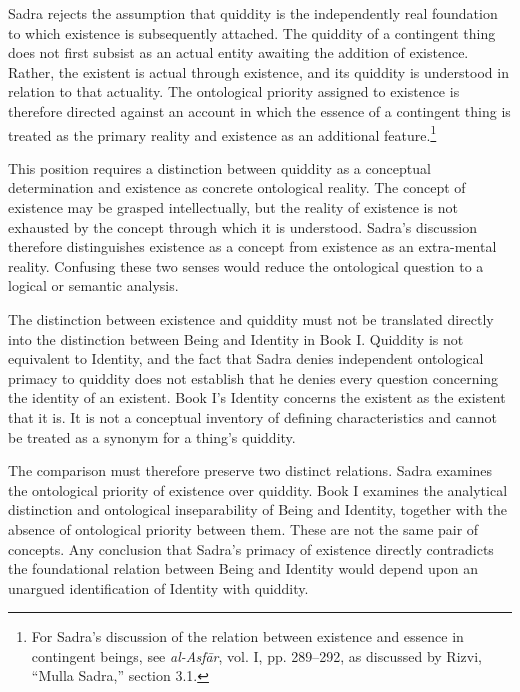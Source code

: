 \label{para:VS.B01.P01.C08.S17.SS04.P002}

Sadra rejects the assumption that
quiddity is the independently real
foundation to which existence is
subsequently attached. The quiddity
of a contingent thing does not first
subsist as an actual entity awaiting
the addition of existence. Rather,
the existent is actual through existence,
and its quiddity is understood in
relation to that actuality. The
ontological priority assigned to
existence is therefore directed
against an account in which the
essence of a contingent thing is
treated as the primary reality
and existence as an additional
feature.\footnote{For Sadra's discussion
of the relation between existence
and essence in contingent beings,
see \textit{al-Asfār}, vol. I,
pp. 289--292, as discussed by Rizvi,
``Mulla Sadra,'' section 3.1.}

\label{para:VS.B01.P01.C08.S17.SS04.P003}

This position requires a distinction
between quiddity as a conceptual
determination and existence as
concrete ontological reality. The
concept of existence may be grasped
intellectually, but the reality of
existence is not exhausted by the
concept through which it is
understood. Sadra's discussion
therefore distinguishes existence
as a concept from existence as
an extra-mental reality. Confusing
these two senses would reduce
the ontological question to a
logical or semantic analysis.

\label{para:VS.B01.P01.C08.S17.SS04.P004}

The distinction between existence
and quiddity must not be translated
directly into the distinction between
Being and Identity in Book I.
Quiddity is not equivalent to Identity,
and the fact that Sadra denies
independent ontological primacy
to quiddity does not establish
that he denies every question
concerning the identity of an existent.
Book I's Identity concerns the
existent as the existent that it is.
It is not a conceptual inventory
of defining characteristics and
cannot be treated as a synonym
for a thing's quiddity.

\label{para:VS.B01.P01.C08.S17.SS04.P005}

The comparison must therefore
preserve two distinct relations.
Sadra examines the ontological
priority of existence over quiddity.
Book I examines the analytical
distinction and ontological
inseparability of Being and Identity,
together with the absence of
ontological priority between them.
These are not the same pair of
concepts. Any conclusion that
Sadra's primacy of existence
directly contradicts the foundational
relation between Being and Identity
would depend upon an unargued
identification of Identity with
quiddity.

